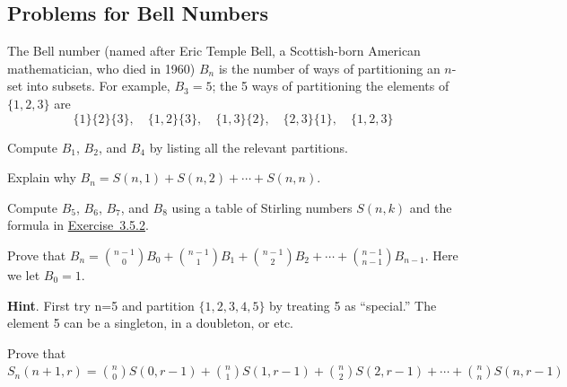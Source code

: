 \documentclass[10pt,]{book}
\theoremstyle{plain}
\theoremstyle{definition}
\theoremstyle{definition}
\theoremstyle{definition}
\theoremstyle{definition}
\numberwithin{equation}{chapter}
\begin{document}
\subsection*{Problems for Bell Numbers}\label{exercises-10}
\hypertarget{p-1142}{}%
The Bell number (named after Eric Temple Bell, a Scottish-born American mathematician, who died in 1960) \(B_{n}\) is the number of ways of partitioning an \(n\)-set into subsets. For example, \(B_{3} = 5\); the 5  ways of partitioning the elements of \(\{1, 2, 3\}\) are%
\begin{equation*}
\{1\} \{2\} \{3\},\quad \{1, 2\} \{3\},\quad  \{1, 3\} \{2\}, \quad \{2, 3\} \{1\}, \quad \{1, 2, 3\}
\end{equation*}
%
\begin{divisionexercise}{1}\hypertarget{exercise-115}{}
\hypertarget{p-1143}{}%
Compute \(B_{1}\), \(B_{2}\), and \(B_{4}\) by listing all the relevant partitions.%
\end{divisionexercise}%
\begin{divisionexercise}{2}\hypertarget{ex-bell-as-stirlings}{}
\hypertarget{p-1144}{}%
Explain why \(B_{n} = S\left( n,1 \right) + S\left( n,2 \right) + \cdots + S(n,n)\).%
\end{divisionexercise}%
\begin{divisionexercise}{3}\hypertarget{exercise-117}{}
\hypertarget{p-1145}{}%
Compute \(B_{5}\), \(B_{6}\), \(B_{7}\), and \(B_{8}\) using a table of Stirling numbers \(S(n,k)\) and the formula in \hyperlink{ex-bell-as-stirlings}{Exercise~3.5.2}.%
\end{divisionexercise}%
\begin{divisionexercise}{4}\hypertarget{ex-bell-recurrence}{}
\hypertarget{p-1146}{}%
Prove that \(B_{n} =  \binom{n - 1}{0} B_{0} + \binom{n - 1}{1} B_{1} + \binom{n - 1}{2} B_{2} + \cdots + \binom{n - 1}{n - 1} B_{n - 1}\).  Here we let \(B_0 = 1\).%
\par\smallskip%
\noindent\textbf{Hint}.\hypertarget{hint-67}{}\quad%
\hypertarget{p-1147}{}%
First try n=5 and partition \(\{ 1,2,3,4,5\}\) by treating 5 as ``special.'' The element 5 can be a singleton, in a doubleton, or etc.%
\end{divisionexercise}%
\begin{divisionexercise}{5}\hypertarget{ex-stirling-recurrence}{}
\hypertarget{p-1148}{}%
Prove that \(S_{n}(n + 1, r) = \binom{n}{0} S(0, r - 1) + \binom{n}{1} S(1, r - 1) + \binom{n}{2} S(2, r - 1) + \cdots + \binom{n}{n} S(n, r - 1)\)%
\end{divisionexercise}%
\end{document}
